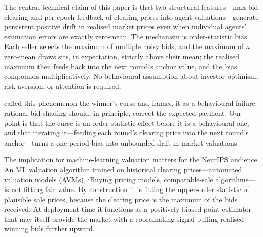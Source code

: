 \documentclass{article}
\begin{document}
The central technical claim of this paper is that two structural
features---max-bid clearing and per-epoch feedback of clearing
prices into agent valuations---generate persistent positive drift in
realised market prices even when individual agents' estimation errors
are exactly zero-mean. The mechanism is order-statistic bias.
Each seller selects the maximum of multiple noisy bids, and the
maximum of $n$ zero-mean draws sits, in expectation, strictly above
their mean; the realised maximum then feeds back into the next
round's anchor value, and the bias compounds multiplicatively. No
behavioural assumption about investor optimism, risk aversion, or
attention is required.

\citet{thaler1988winners} called this phenomenon the winner's curse
and framed it as a behavioural failure: rational bid shading should,
in principle, correct the expected payment. Our point is that the
curse is an order-statistic effect before it is a behavioural one,
and that iterating it---feeding each round's clearing price into the
next round's anchor---turns a one-period bias into unbounded
drift in market valuations.

The implication for machine-learning valuation matters for the
NeurIPS audience. An ML valuation algorithm trained on historical
clearing prices---automated valuation models (AVMs), iBuying
pricing models, comparable-sale algorithms---is not fitting fair
value. By construction it is fitting the upper-order statistic of
plausible sale prices, because the clearing price is the maximum of
the bids received. At deployment time it functions as a
positively-biased point estimator that may itself provide the market
with a coordinating signal pulling realised winning bids further
upward.
\end{document}
